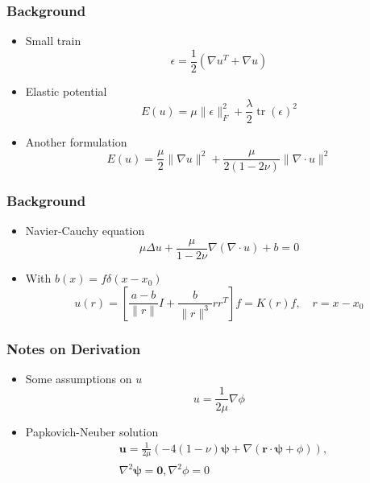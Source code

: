 \documentclass[serif,mathserif, 12pt]{beamer}
\newcommand{\BOLD}[1]{\mathbf{#1}}
\newcommand{\BOLDG}[1]{\boldsymbol{#1}}
\DeclareMathOperator{\tr}{tr}
\begin{document}
\begin{frame}
  \frametitle{Background}
  \begin{itemize}
  \item Small train
    \begin{equation*}
      \epsilon = \frac{1}{2}(\nabla u^T + \nabla u)
    \end{equation*}
  \item Elastic potential
    \begin{equation*}
      E(u) = \mu\|\epsilon\|_F^2 + \frac{\lambda}{2}\tr(\epsilon)^2
    \end{equation*}
  \item Another formulation
    \begin{equation*}
      E(u) = \frac{\mu}{2}\|\nabla u\|^2 + \frac{\mu}{2(1-2\nu)}\|\nabla \cdot u\|^2
    \end{equation*}
  \end{itemize}
\end{frame}

\begin{frame}
  \frametitle{Background}
  \begin{itemize}
  \item Navier-Cauchy equation
    \begin{equation*}
      \mu \Delta u + \frac{\mu}{1-2\nu}\nabla(\nabla \cdot u) + b = 0
    \end{equation*}
    \pause
  \item With $b(x) = f\delta(x-x_0)$
    \begin{equation*}
      u(r) = \left[ \frac{a-b}{\|r\|}I+ \frac{b}{\|r\|^3}rr^T\right]f = K(r)f, \quad r = x-x_0
    \end{equation*}
  \end{itemize}
\end{frame}

\begin{frame}
  \frametitle{Notes on Derivation}
  \begin{itemize}
  \item Some assumptions on $u$
    \begin{equation*}
      u = \frac{1}{2\mu}\nabla \phi
    \end{equation*}
    \pause
  \item Papkovich-Neuber solution
    \begin{equation*}
      \begin{split}
        &\BOLD{u} = \frac{1}{2\mu}(-4(1-\nu)\BOLDG{\psi} +\nabla (\BOLD{r}\cdot \BOLDG{\psi}+\phi)), \\
        &\nabla^2 \BOLDG{\psi} = \BOLD{0}, \nabla^2 \phi = 0
      \end{split}      
    \end{equation*}
  \end{itemize}
\end{frame}
\end{document}
